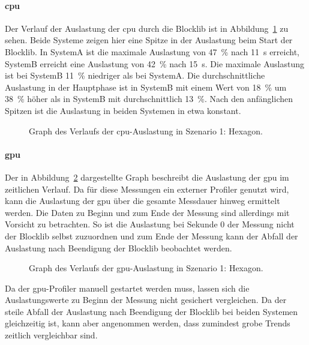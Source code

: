 \paragraph{\ac{cpu}} Der Verlauf der Auslastung der \ac{cpu} durch die Blocklib ist in Abbildung~\ref{fig:seed-0-hexagon-cpu} zu sehen. Beide Systeme zeigen hier eine Spitze in der Auslastung beim Start der Blocklib. In SystemA ist die maximale Auslastung von \SI{47}{\percent} nach \SI{11}{\second} erreicht, SystemB erreicht eine Auslastung von \SI{42}{\percent} nach \SI{15}{\second}. Die maximale Auslastung ist bei SystemB \SI{11}{\percent} niedriger als bei SystemA. Die durchschnittliche Auslastung in der Hauptphase ist in SystemB mit einem Wert von \SI{18}{\percent} um \SI{38}{\percent} höher als in SystemB mit durchschnittlich \SI{13}{\percent}. Nach den anfänglichen Spitzen ist die Auslastung in beiden Systemen in etwa konstant.
\begin{figure}[!htbp]
	\caption[Graph des Verlaufs der -Auslastung in Szenario 1: Hexagon.]{Graph des Verlaufs der \ac{cpu}-Auslastung in Szenario 1: Hexagon.}\label{fig:seed-0-hexagon-cpu}
\end{figure}


\paragraph{\ac{gpu}} Der in Abbildung~\ref{fig:seed-0-hexagon-gpu} dargestellte Graph beschreibt die Auslastung der \ac{gpu} im zeitlichen Verlauf. Da für diese Messungen ein externer Profiler genutzt wird, kann die Auslastung der \ac{gpu} über die gesamte Messdauer hinweg ermittelt werden. Die Daten zu Beginn und zum Ende der Messung sind allerdings mit Vorsicht zu betrachten. So ist die Auslastung bei Sekunde $0$ der Messung nicht der Blocklib selbst zuzuordnen und zum Ende der Messung kann der Abfall der Auslastung nach Beendigung der Blocklib beobachtet werden. 
\begin{figure}[!htbp]
	\caption[Graph des Verlaufs der -Auslastung in Szenario 1: Hexagon.]{Graph des Verlaufs der \ac{gpu}-Auslastung in Szenario 1: Hexagon.}\label{fig:seed-0-hexagon-gpu}
\end{figure}

Da der \ac{gpu}-Profiler manuell gestartet werden muss, lassen sich die Auslastungswerte zu Beginn der Messung nicht gesichert vergleichen. Da der steile Abfall der Auslastung nach Beendigung der Blocklib bei beiden Systemen gleichzeitig ist, kann aber angenommen werden, dass zumindest grobe Trends zeitlich vergleichbar sind.

